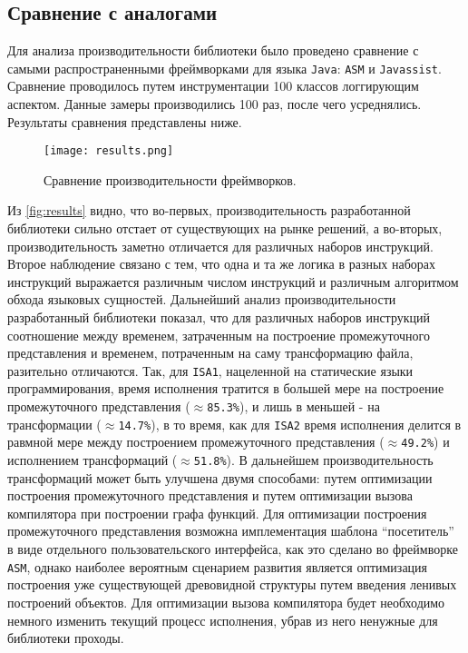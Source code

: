 \subsection{Сравнение с аналогами}

Для анализа производительности библиотеки было проведено сравнение с самыми распространенными фреймворками для языка \texttt{Java}: \texttt{ASM} и \texttt{Javassist}. Сравнение проводилось путем инструментации 100 классов логгирующим аспектом. Данные замеры производились 100 раз, после чего усреднялись. Результаты сравнения представлены ниже.

\begin{figure}[h]
\centering
\texttt{[image: results.png]}
\caption{Сравнение производительности фреймворков.}
\label{fig:results}
\end{figure}

Из \autoref{fig:results} видно, что во-первых, производительность разработанной библиотеки сильно отстает от существующих на рынке решений, а во-вторых, производительность заметно отличается для различных наборов инструкций. Второе наблюдение связано с тем, что одна и та же логика в разных наборах инструкций выражается различным числом инструкций и различным алгоритмом обхода языковых сущностей. Дальнейший анализ производительности разработанный библиотеки показал, что для различных наборов инструкций соотношение между временем, затраченным на построение промежуточного представления и временем, потраченным на саму трансформацию файла, разительно отличаются. Так, для \texttt{ISA1}, нацеленной на статические языки программирования, время исполнения тратится в большей мере на построение промежуточного представления (\texttt{$\approx$85.3\%}), и лишь в меньшей - на трансформации (\texttt{$\approx$14.7\%}), в то время, как для \texttt{ISA2} время исполнения делится в равмной мере между построением промежуточного представления (\texttt{$\approx$49.2\%}) и исполнением трансформаций (\texttt{$\approx$51.8\%}). В дальнейшем производительность трансформаций может быть улучшена двумя способами: путем оптимизации построения промежуточного представления и путем оптимизации вызова компилятора при построении графа функций. Для оптимизации построения промежуточного представления возможна имплементация шаблона ``посетитель'' в виде отдельного пользовательского интерфейса, как это сделано во фреймворке \texttt{ASM}, однако наиболее вероятным сценарием развития является оптимизация построения уже существующей древовидной структуры путем введения ленивых построений объектов. Для оптимизации вызова компилятора будет необходимо немного изменить текущий процесс исполнения, убрав из него ненужные для библиотеки проходы.
